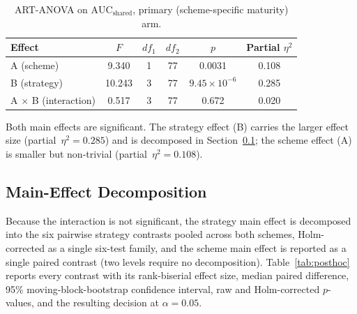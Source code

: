 \begin{table}[htbp]
  \centering
  \footnotesize
  \begin{tabular}{l c c c c c}
    \toprule
    Effect & $F$ & $df_1$ & $df_2$ & $p$ & Partial $\eta^2$ \\
    \midrule
    A (scheme) & 9.340 & 1 & 77 & 0.0031 & 0.108 \\
    B (strategy) & 10.243 & 3 & 77 & $9.45\times 10^{-6}$ & 0.285 \\
    A $\times$ B (interaction) & 0.517 & 3 & 77 & 0.672 & 0.020 \\
    \bottomrule
  \end{tabular}
  \caption{ART-ANOVA on $\text{AUC}_{\text{shared}}$, primary (scheme-specific maturity) arm.}
  \label{tab:art-primary}
\end{table}

Both main effects are significant. The strategy effect (B) carries the larger effect size (partial~$\eta^2=0.285$) and is decomposed in Section~\ref{sec:posthoc}; the scheme effect (A) is smaller but non-trivial (partial~$\eta^2=0.108$).

\subsection{Main-Effect Decomposition}
\label{sec:posthoc}

Because the interaction is not significant, the strategy main effect is decomposed into the six pairwise strategy contrasts pooled across both schemes, Holm-corrected as a single six-test family, and the scheme main effect is reported as a single paired contrast (two levels require no decomposition). Table~\ref{tab:posthoc} reports every contrast with its rank-biserial effect size, median paired difference, 95\% moving-block-bootstrap confidence interval, raw and Holm-corrected $p$-values, and the resulting decision at $\alpha=0.05$.

